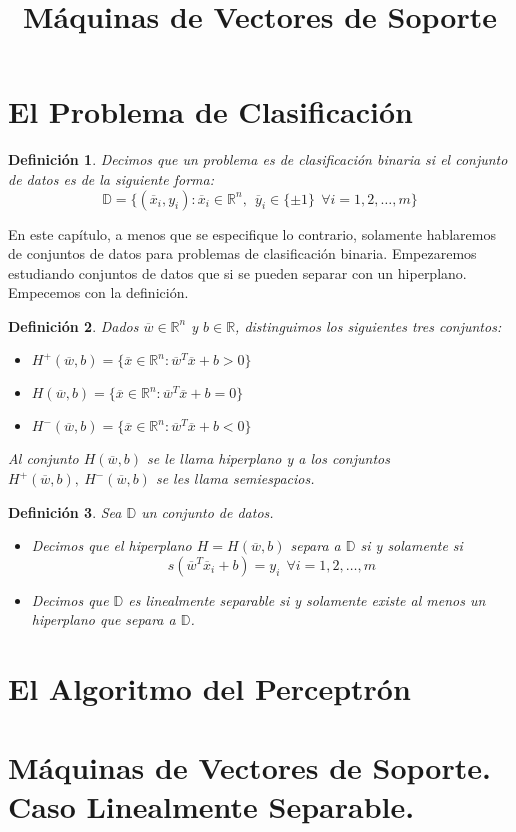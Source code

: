 \documentclass[11pt]{article}
\newtheorem{definition}{Definición}[section]
\newcommand{\R}{\mathbb{R}}
\newcommand{\Rn}{\R^{n}}
\newcommand{\wv}{\overline{w}}
\newcommand{\x}{\overline{x}}
\newcommand{\y}{\overline{y}}
\newcommand{\Sm}{1,2,\ldots, m}
\newcommand{\Dat}{\mathbb{D}}
\begin{document}
\title{Máquinas de Vectores de Soporte}
\section{El Problema de Clasificación}

\begin{definition}
Decimos que un problema es de clasificación binaria si el conjunto de datos es de la siguiente forma:
$$\Dat=\{(\x_{i}, y_i): \x_{i}\in\Rn,\ \ \y_{i}\in\{\pm1\}\ \ \forall i = \Sm\}$$
\end{definition}

En este capítulo, a menos que se especifique lo contrario, solamente hablaremos de conjuntos de datos para problemas de clasificación binaria.
Empezaremos estudiando conjuntos de datos que si se pueden separar con un hiperplano. Empecemos con la definición.

\begin{definition}
Dados $\wv\in\Rn$ y $b\in\R$, distinguimos los siguientes tres conjuntos:
\begin{itemize}
\item[(i)] $H^{+}(\wv, b)=\{\x\in\Rn:\wv^{T}\x+b>0\}$
\item[(ii)] $H(\wv, b)=\{\x\in\Rn:\wv^{T}\x+b=0\}$
\item[(iii)] $H^{-}(\wv, b)=\{\x\in\Rn:\wv^{T}\x+b<0\}$
\end{itemize}
Al conjunto $H(\wv, b)$ se le llama \emph{hiperplano} y a los conjuntos $H^{+}(\wv, b),\ H^{-}(\wv, b)$ se les llama \emph{semiespacios}.
\end{definition}

\begin{definition}
Sea $\Dat$ un conjunto de datos.
\begin{itemize}
\item[(i)] Decimos que el hiperplano $H=H(\wv, b)$ separa a $\Dat$ si y solamente si
$$s(\wv^{T}\x_{i}+b)=y_{i}\ \ \forall i=\Sm$$
\item[(ii)] Decimos que $\Dat$ es linealmente separable si y solamente existe al menos un hiperplano que separa a $\Dat$.
\end{itemize}
\end{definition}
\section{El Algoritmo del Perceptrón}
\section{Máquinas de Vectores de Soporte. Caso Linealmente Separable.}
\end{document}
